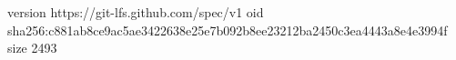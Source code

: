 version https://git-lfs.github.com/spec/v1
oid sha256:c881ab8ce9ac5ae3422638e25e7b092b8ee23212ba2450c3ea4443a8e4e3994f
size 2493
